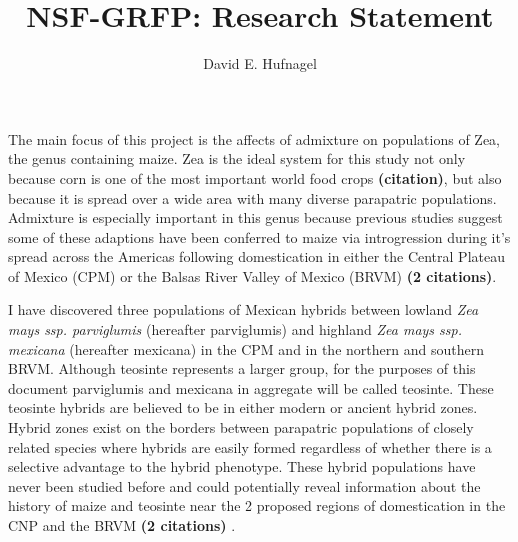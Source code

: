 \documentclass[12pt]{amsart}
\title{NSF-GRFP: Research Statement}
\author{David E. Hufnagel}
\begin{document}
\maketitle

The main focus of this project is the affects of admixture on populations of Zea, the genus containing maize.  
Zea is the ideal system for this study not only because corn is one of the most important world food crops \textbf{(citation)}, but also because it is spread over a wide area with many diverse parapatric populations.  
Admixture is especially important in this genus because previous studies suggest some of these adaptions have been conferred to maize via introgression during it's spread across the Americas following domestication in either the Central Plateau of Mexico (CPM) or the Balsas River Valley of Mexico (BRVM) \textbf{(2 citations)}.  


I have discovered three populations of Mexican hybrids between lowland \textit{Zea mays ssp. parviglumis} (hereafter parviglumis) and highland \textit{Zea mays ssp. mexicana} (hereafter mexicana) in the CPM and in the northern and southern BRVM.
Although teosinte represents a larger group, for the purposes of this document parviglumis and mexicana in aggregate will be called teosinte.
These teosinte hybrids are believed to be in either modern or ancient hybrid zones.  
Hybrid zones exist on the borders between parapatric populations of closely related species where hybrids are easily formed regardless of whether there is a selective advantage to the hybrid phenotype.
These hybrid populations have never been studied before and could potentially reveal information about the history of maize and teosinte near the 2 proposed regions of domestication in the CNP and the BRVM \textbf{(2 citations)} .
\end{document}
